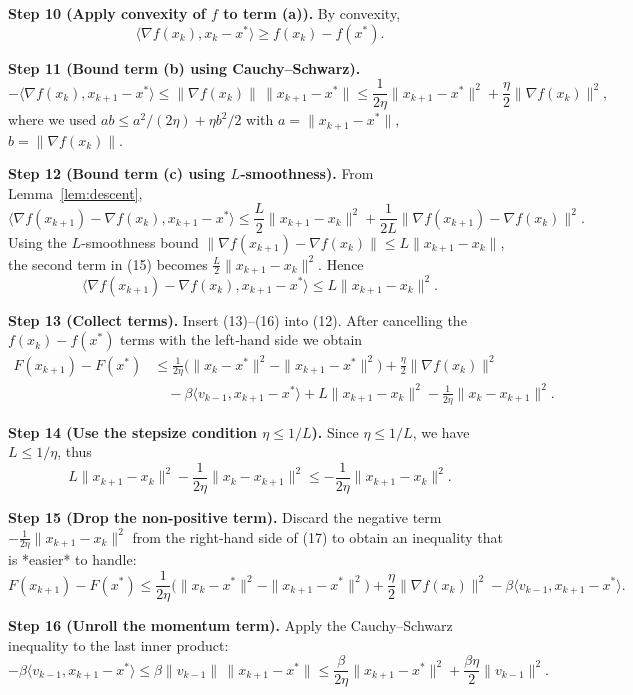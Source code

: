 \documentclass{article}
\begin{document}
\noindent\textbf{Step 10 (Apply convexity of $f$ to term (a)).}  
By convexity,
\[
\langle\nabla f(x_{k}),x_{k}-x^{*}\rangle \ge f(x_{k})-f(x^{*}) .
\tag{13}
\]

\noindent\textbf{Step 11 (Bound term (b) using Cauchy–Schwarz).}  
\[
-\langle\nabla f(x_{k}),x_{k+1}-x^{*}\rangle
\le
\|\nabla f(x_{k})\|\,\|x_{k+1}-x^{*}\|
\le
\frac{1}{2\eta}\|x_{k+1}-x^{*}\|^{2}+ \frac{\eta}{2}\|\nabla f(x_{k})\|^{2},
\tag{14}
\]
where we used $ab\le a^{2}/(2\eta)+\eta b^{2}/2$ with $a=\|x_{k+1}-x^{*}\|$, $b=\|\nabla f(x_{k})\|$.

\noindent\textbf{Step 12 (Bound term (c) using $L$‑smoothness).}  
From Lemma~\ref{lem:descent},
\[
\langle\nabla f(x_{k+1})-\nabla f(x_{k}),x_{k+1}-x^{*}\rangle
\le
\frac{L}{2}\|x_{k+1}-x_{k}\|^{2}
+\frac{1}{2L}\|\nabla f(x_{k+1})-\nabla f(x_{k})\|^{2}.
\tag{15}
\]
Using the $L$‑smoothness bound $\|\nabla f(x_{k+1})-\nabla f(x_{k})\|\le L\|x_{k+1}-x_{k}\|$, the second term in (15) becomes
$\frac{L}{2}\|x_{k+1}-x_{k}\|^{2}$. Hence
\[
\langle\nabla f(x_{k+1})-\nabla f(x_{k}),x_{k+1}-x^{*}\rangle
\le L\|x_{k+1}-x_{k}\|^{2}.
\tag{16}
\]

\noindent\textbf{Step 13 (Collect terms).}  
Insert (13)–(16) into (12). After cancelling the $f(x_{k})-f(x^{*})$ terms with the left‑hand side we obtain
\[
\begin{aligned}
F(x_{k+1})-F(x^{*})
&\le
\frac{1}{2\eta}\bigl(\|x_{k}-x^{*}\|^{2}-\|x_{k+1}-x^{*}\|^{2}\bigr)
+\frac{\eta}{2}\|\nabla f(x_{k})\|^{2}\\
&\quad
-\beta\langle v_{k-1},x_{k+1}-x^{*}\rangle
+L\|x_{k+1}-x_{k}\|^{2}
-\frac{1}{2\eta}\|x_{k}-x_{k+1}\|^{2}.
\end{aligned}
\tag{17}
\]

\noindent\textbf{Step 14 (Use the stepsize condition $\eta\le 1/L$).}  
Since $\eta\le 1/L$, we have $L\le 1/\eta$, thus
\[
L\|x_{k+1}-x_{k}\|^{2}-\frac{1}{2\eta}\|x_{k}-x_{k+1}\|^{2}
\le -\frac{1}{2\eta}\|x_{k+1}-x_{k}\|^{2}.
\tag{18}
\]

\noindent\textbf{Step 15 (Drop the non‑positive term).}  
Discard the negative term $-\frac{1}{2\eta}\|x_{k+1}-x_{k}\|^{2}$ from the right‑hand side of (17) to obtain an inequality that is *easier* to handle:
\[
F(x_{k+1})-F(x^{*})
\le
\frac{1}{2\eta}\bigl(\|x_{k}-x^{*}\|^{2}-\|x_{k+1}-x^{*}\|^{2}\bigr)
+\frac{\eta}{2}\|\nabla f(x_{k})\|^{2}
-\beta\langle v_{k-1},x_{k+1}-x^{*}\rangle .
\tag{19}
\]

\noindent\textbf{Step 16 (Unroll the momentum term).}  
Apply the Cauchy–Schwarz inequality to the last inner product:
\[
-\beta\langle v_{k-1},x_{k+1}-x^{*}\rangle
\le
\beta\|v_{k-1}\|\,\|x_{k+1}-x^{*}\|
\le
\frac{\beta}{2\eta}\|x_{k+1}-x^{*}\|^{2}
+\frac{\beta\eta}{2}\|v_{k-1}\|^{2}.
\tag{20}
\]
\end{document}
